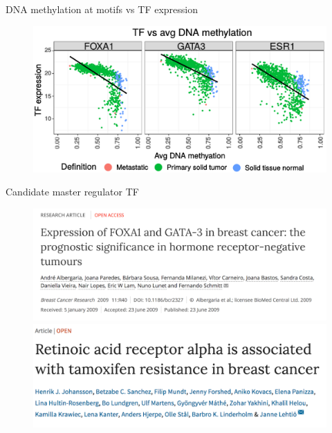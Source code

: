 \documentclass[slidestop,compress,11pt,xcolor=dvipsnames]{beamer}
\begin{document}
\begin{frame}{DNA methylation at motifs vs TF expression}
 \begin{figure}
  \centering
  \includegraphics[width=1.0\linewidth]{ELMER/BRCA_TF_scatter.pdf}
 \end{figure}
\end{frame}


\begin{frame}{Candidate master regulator TF}
 \vspace*{-0.3cm}
 \begin{figure}
  \centering
  \includegraphics[width=0.8\linewidth]{ELMER/paper4.png}\\
  \includegraphics[width=0.8\linewidth]{ELMER/paper2.png}
 \end{figure}
\end{frame}

\end{document}
